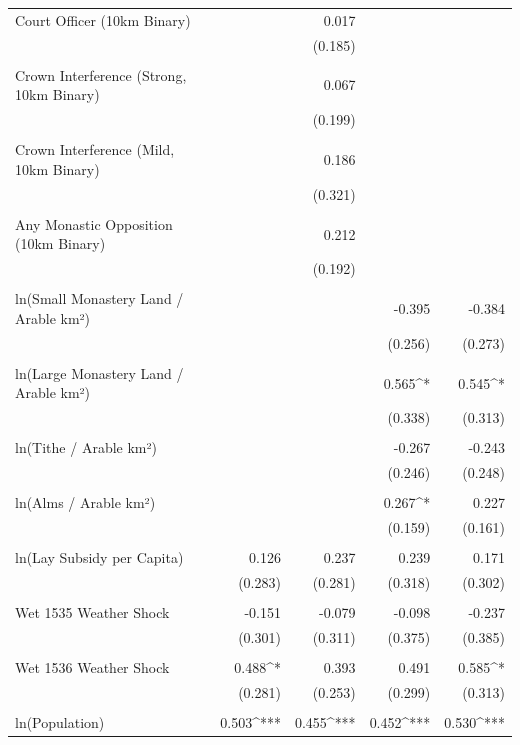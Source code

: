 \begin{table}[H]
\begin{tabular}{@{\extracolsep{.5pt}}lD{.}{.}{-3} D{.}{.}{-3} D{.}{.}{-3} D{.}{.}{-3} }
 Court Officer (10km Binary) &  & 0.017 &  &  \\ 
  &  & (0.185) &  &  \\ 
  & & & & \\ 
 Crown Interference (Strong, 10km Binary) &  & 0.067 &  &  \\ 
  &  & (0.199) &  &  \\ 
  & & & & \\ 
 Crown Interference (Mild, 10km Binary) &  & 0.186 &  &  \\ 
  &  & (0.321) &  &  \\ 
  & & & & \\ 
 Any Monastic Opposition (10km Binary) &  & 0.212 &  &  \\ 
  &  & (0.192) &  &  \\ 
  & & & & \\ 
 ln(Small Monastery Land / Arable km²) &  &  & -0.395 & -0.384 \\ 
  &  &  & (0.256) & (0.273) \\ 
  & & & & \\ 
 ln(Large Monastery Land / Arable km²) &  &  & 0.565^{*} & 0.545^{*} \\ 
  &  &  & (0.338) & (0.313) \\ 
  & & & & \\ 
 ln(Tithe / Arable km²) &  &  & -0.267 & -0.243 \\ 
  &  &  & (0.246) & (0.248) \\ 
  & & & & \\ 
 ln(Alms / Arable km²) &  &  & 0.267^{*} & 0.227 \\ 
  &  &  & (0.159) & (0.161) \\ 
  & & & & \\ 
 ln(Lay Subsidy per Capita) & 0.126 & 0.237 & 0.239 & 0.171 \\ 
  & (0.283) & (0.281) & (0.318) & (0.302) \\ 
  & & & & \\ 
 Wet 1535 Weather Shock & -0.151 & -0.079 & -0.098 & -0.237 \\ 
  & (0.301) & (0.311) & (0.375) & (0.385) \\ 
  & & & & \\ 
 Wet 1536 Weather Shock & 0.488^{*} & 0.393 & 0.491 & 0.585^{*} \\ 
  & (0.281) & (0.253) & (0.299) & (0.313) \\ 
  & & & & \\ 
 ln(Population) & 0.503^{***} & 0.455^{***} & 0.452^{***} & 0.530^{***} \\ 

\end{tabular}
\end{table}
